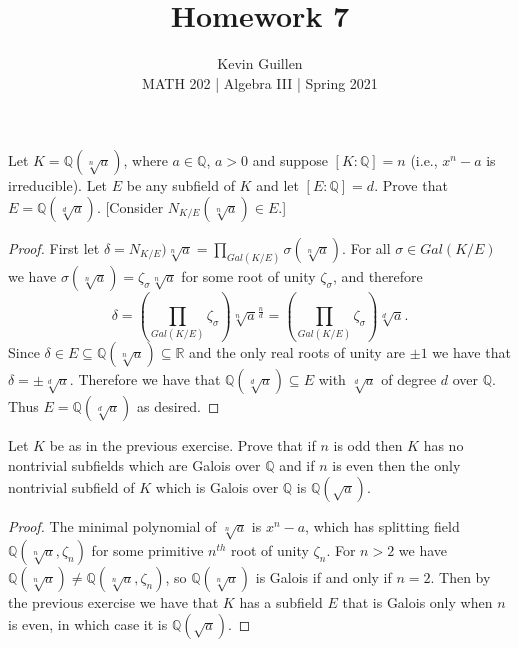 \documentclass[11pt]{article}
\newenvironment{problem}[2][Problem\!]{\begin{tcolorbox}\begin{trivlist}
\item[\hskip \labelsep {\bfseries #1}\hskip \labelsep {\bfseries #2}]}{\end{trivlist}\end{tcolorbox}}
\newcommand{\qq}{\mathbb Q}   %
\newcommand{\rr}{\mathbb R}   %
\newcommand{\lrp}[1]{\left(#1\right)}
\begin{document}
 
\title{Homework 7}
\author{Kevin Guillen\\[0.5em]
MATH 202 | Algebra III | Spring 2021}
\date{} 
\maketitle


\begin{problem} {14.7.4}
    Let $K = \qq(\sqrt[n]{a})$, where $a \in \qq$, $a > 0$ and suppose $[K:\qq] = n $ (i.e., $x^{n} - a$ is irreducible). Let $E$ be any subfield of $K$ and let $[E : \qq] = d$. Prove that $E = \qq(\sqrt[d]{a})$. [Consider $N_{K/E}(\sqrt[n]{a}) \in E$.]
\end{problem}
\begin{proof}
    First let $\delta = N_{K/E})\sqrt[n]{a} = \prod_{Gal(K/E)} \sigma(\sqrt[n]{a})$. For all $\sigma \in Gal(K/E)$ we have $\sigma(\sqrt[n]{a}) = \zeta_\sigma \sqrt[n]{a}$ for some root of unity $\zeta_\sigma$, and therefore \[\delta = \lrp{\prod_{Gal(K/E)}\zeta_\sigma}\sqrt[n]{a}^{\frac{n}{d}} = \lrp{\prod_{Gal(K/E)}\zeta_\sigma}\sqrt[d]{a}.\] Since $\delta \in E \subseteq \qq(\sqrt[n]{a})\subseteq \rr$ and the only real roots of unity are $\pm 1$ we have that $\delta = \pm \sqrt[d]{a}$. Therefore we have that $\qq(\sqrt[d]{a})\subseteq E$ with $\sqrt[d]{a}$ of degree $d$ over $\qq$. Thus $E = \qq(\sqrt[d]{a})$ as desired. 
\end{proof}

\vspace*{15pt}

\begin{problem} {14.7.5}
    Let $K$ be as in the previous exercise. Prove that if $n$ is odd then $K$ has no nontrivial subfields which are Galois over $\qq$ and if $n$ is even then the only nontrivial subfield of $K$ which is Galois over $\qq$ is $\qq(\sqrt{a})$. 
\end{problem}
\begin{proof}
    The minimal polynomial of $\sqrt[n]{a}$ is $x^{n} - a$, which has splitting field $\qq(\sqrt[n]{a}, \zeta_n)$ for some primitive $n^{th}$ root of unity $\zeta_n$. For $n > 2$ we have $\qq(\sqrt[n]{a}) \neq \qq(\sqrt[n]{a}, \zeta_n)$, so $\qq(\sqrt[n]{a})$ is Galois if and only if $n = 2$. Then by the previous exercise we have that $K$ has a subfield $E$ that is Galois only when $n$ is even, in which case it is $\qq(\sqrt{a})$.
\end{proof}
\end{document}
